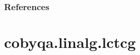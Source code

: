 \documentclass[letterpaper,10pt,english]{sphinxmanual}
\begin{document}
\begin{fulllineitems}
\subsubsection*{References}

\sphinxAtStartPar
{}

\end{fulllineitems}



\section{cobyqa.linalg.lctcg}
\label{\detokenize{refs/generated/cobyqa.linalg.lctcg:cobyqa-linalg-lctcg}}\label{\detokenize{refs/generated/cobyqa.linalg.lctcg::doc}}
\end{document}

